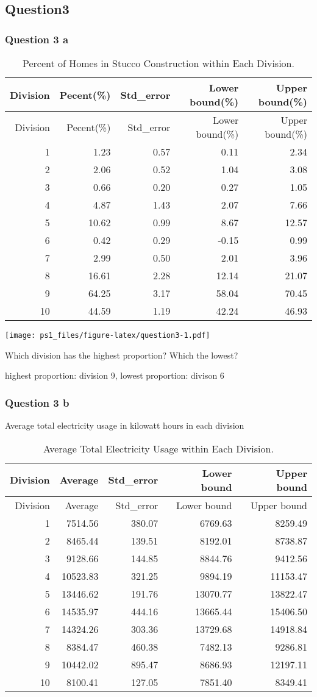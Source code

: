 \documentclass[]{article}
\begin{document}
\pagebreak

\subsection{Question3}\label{question3}

\subsubsection{Question 3 a}\label{question-3-a}

\begin{longtable}[]{@{}rrrrr@{}}
\caption{Percent of Homes in Stucco Construction within Each
Division.}\tabularnewline
\toprule
Division & Pecent(\%) & Std\_error & Lower bound(\%) & Upper
bound(\%)\tabularnewline
\midrule
\endfirsthead
\toprule
Division & Pecent(\%) & Std\_error & Lower bound(\%) & Upper
bound(\%)\tabularnewline
\midrule
\endhead
1 & 1.23 & 0.57 & 0.11 & 2.34\tabularnewline
2 & 2.06 & 0.52 & 1.04 & 3.08\tabularnewline
3 & 0.66 & 0.20 & 0.27 & 1.05\tabularnewline
4 & 4.87 & 1.43 & 2.07 & 7.66\tabularnewline
5 & 10.62 & 0.99 & 8.67 & 12.57\tabularnewline
6 & 0.42 & 0.29 & -0.15 & 0.99\tabularnewline
7 & 2.99 & 0.50 & 2.01 & 3.96\tabularnewline
8 & 16.61 & 2.28 & 12.14 & 21.07\tabularnewline
9 & 64.25 & 3.17 & 58.04 & 70.45\tabularnewline
10 & 44.59 & 1.19 & 42.24 & 46.93\tabularnewline
\bottomrule
\end{longtable}

\texttt{[image: ps1\_files/figure-latex/question3-1.pdf]}

Which division has the highest proportion? Which the lowest?

highest proportion: division 9, lowest proportion: divison 6

\subsubsection{Question 3 b}\label{question-3-b}

Average total electricity usage in kilowatt hours in each division

\begin{longtable}[]{@{}rrrrr@{}}
\caption{Average Total Electricity Usage within Each
Division.}\tabularnewline
\toprule
Division & Average & Std\_error & Lower bound & Upper
bound\tabularnewline
\midrule
\endfirsthead
\toprule
Division & Average & Std\_error & Lower bound & Upper
bound\tabularnewline
\midrule
\endhead
1 & 7514.56 & 380.07 & 6769.63 & 8259.49\tabularnewline
2 & 8465.44 & 139.51 & 8192.01 & 8738.87\tabularnewline
3 & 9128.66 & 144.85 & 8844.76 & 9412.56\tabularnewline
4 & 10523.83 & 321.25 & 9894.19 & 11153.47\tabularnewline
5 & 13446.62 & 191.76 & 13070.77 & 13822.47\tabularnewline
6 & 14535.97 & 444.16 & 13665.44 & 15406.50\tabularnewline
7 & 14324.26 & 303.36 & 13729.68 & 14918.84\tabularnewline
8 & 8384.47 & 460.38 & 7482.13 & 9286.81\tabularnewline
9 & 10442.02 & 895.47 & 8686.93 & 12197.11\tabularnewline
10 & 8100.41 & 127.05 & 7851.40 & 8349.41\tabularnewline
\bottomrule
\end{longtable}
\end{document}
